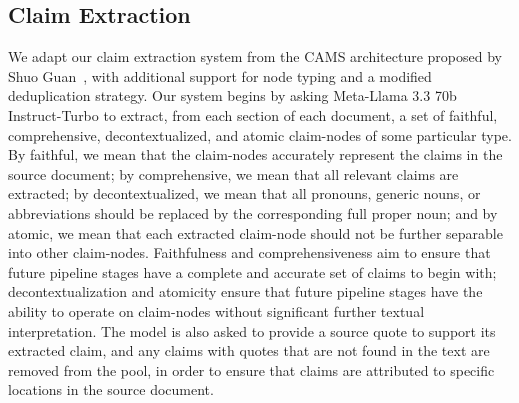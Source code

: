 \documentclass{article}
\begin{document}

\subsection{Claim Extraction}

We adapt our claim extraction system from the CAMS architecture proposed by Shuo Guan~\cite{guan_cams}, with additional support for node typing and a modified deduplication strategy. Our system begins by asking Meta-Llama 3.3 70b ~\cite{grattafiori2024llama3} Instruct-Turbo to extract, from each section of each document, a set of faithful, comprehensive, decontextualized, and atomic claim-nodes of some particular type. By faithful, we mean that the claim-nodes accurately represent the claims in the source document; by comprehensive, we mean that all relevant claims are extracted; by decontextualized, we mean that all pronouns, generic nouns, or abbreviations should be replaced by the corresponding full proper noun; and by atomic, we mean that each extracted claim-node should not be further separable into other claim-nodes. Faithfulness and comprehensiveness aim to ensure that future pipeline stages have a complete and accurate set of claims to begin with; decontextualization and atomicity ensure that future pipeline stages have the ability to operate on claim-nodes without significant further textual interpretation. The model is also asked to provide a source quote to support its extracted claim, and any claims with quotes that are not found in the text are removed from the pool, in order to ensure that claims are attributed to specific locations in the source document.
\end{document}
